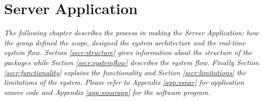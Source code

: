 \chapter{Server Application}
\textit{The following chapter describes the process in making the Server Application: how the group defined the scope, designed the system architecture and the real-time system flow. Section \ref{secr:structure} gives information about the structure of the packages while Section \ref{secr:systemflow} describes the system flow. Finally Section \ref{secr:functionality} explains the functionality and Section \ref{secr:limitations} the limitations of the system. Please refer to Appendix \ref{app:ssnar} for application source code and Appendix \ref{app:ssnarapp} for the software program.}






